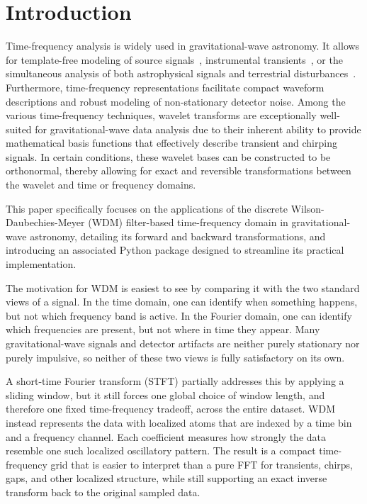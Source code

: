 \documentclass[%
 reprint,
superscriptaddress,
nofootinbib,
 amsmath,amssymb,
 aps,
colorlinks = true, 
linkcolor = blue, 
urlcolor = blue, 
citecolor = blue, 
anchorcolor = blue,
]{revtex4-2}
\begin{document}
\section{Introduction}
Time-frequency analysis is widely used in gravitational-wave astronomy. 
It allows for template-free modeling of source signals~\cite{krolak_1996,Virtuoso2024},  instrumental transients~\cite{robinet2020}, or the simultaneous analysis of both astrophysical signals and terrestrial disturbances~\cite{Cornish_2015}.
Furthermore, time-frequency representations facilitate compact waveform descriptions and robust modeling of non-stationary detector noise. 
Among the various time-frequency techniques, wavelet transforms are exceptionally well-suited for gravitational-wave data analysis due to their inherent ability to provide mathematical basis functions that effectively describe transient and chirping signals.
In certain conditions, these wavelet bases can be constructed to be orthonormal, thereby allowing for exact and reversible transformations between the wavelet and time or frequency domains. 




This paper specifically focuses on the applications of the discrete Wilson-Daubechies-Meyer (WDM) filter-based time-frequency domain in gravitational-wave astronomy, detailing its forward and backward transformations, and introducing an associated Python package designed to streamline its practical implementation.

The motivation for WDM is easiest to see by comparing it with the two standard views of a signal. In the time domain, one can identify when something happens, but not which frequency band is active. In the Fourier domain, one can identify which frequencies are present, but not where in time they appear. Many gravitational-wave signals and detector artifacts are neither purely stationary nor purely impulsive, so neither of these two views is fully satisfactory on its own.

A short-time Fourier transform (STFT) partially addresses this by applying a sliding window, but it still forces one global choice of window length, and therefore one fixed time-frequency tradeoff, across the entire dataset. WDM instead represents the data with localized atoms that are indexed by a time bin and a frequency channel. Each coefficient measures how strongly the data resemble one such localized oscillatory pattern. The result is a compact time-frequency grid that is easier to interpret than a pure FFT for transients, chirps, gaps, and other localized structure, while still supporting an exact inverse transform back to the original sampled data.
\end{document}

